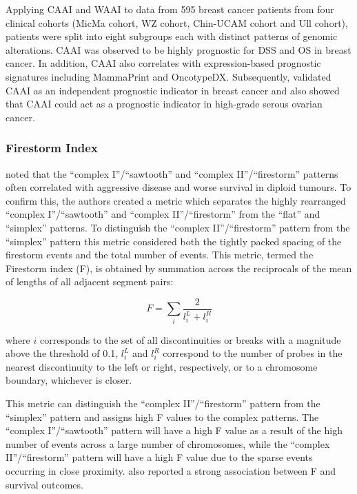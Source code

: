 Applying CAAI and WAAI to data from 595 breast cancer patients from four clinical cohorts (MicMa cohort, WZ cohort, Chin-UCAM cohort and Ull cohort), patients were split into eight subgroups each with distinct patterns of genomic alterations. CAAI was observed to be highly prognostic for DSS and OS in breast cancer. In addition, CAAI also correlates with expression-based prognostic signatures including MammaPrint and OncotypeDX. Subsequently, \cite{pmid25169931} validated CAAI as an independent prognostic indicator in breast cancer and also showed that CAAI could act as a prognostic indicator in high-grade serous ovarian cancer.

\subsubsection{Firestorm Index}
\label{MeasureGIFI}
\cite{pmid17142309} noted that the “complex I”/“sawtooth” and “complex II”/“firestorm” patterns often correlated with aggressive disease and worse survival in diploid tumours. To confirm this, the authors created a metric which separates the highly rearranged “complex I”/“sawtooth” and “complex II”/“firestorm” from the “flat” and “simplex” patterns. To distinguish the “complex II”/“firestorm” pattern from the “simplex” pattern this metric considered both the tightly packed spacing of the firestorm events and the total number of events. This metric, termed the Firestorm index (F), is obtained by summation across the reciprocals of the mean of lengths of all adjacent segment pairs: 

\begin{equation}
F = \sum_i{\frac{2}{l_i^L + l_i^R}}
\end{equation}

where $i$ corresponds to the set of all discontinuities or breaks with a magnitude above the threshold of 0.1, $l_i^L$ and $l_i^R$ correspond to the number of probes in the nearest discontinuity to the left or right, respectively, or to a chromosome boundary, whichever is closer.

This metric can distinguish the “complex II”/“firestorm” pattern from the “simplex” pattern and assigns high F values to the complex patterns. The “complex I”/“sawtooth” pattern will have a high F value as a result of the high number of events across a large number of chromosomes, while the “complex II”/“firestorm” pattern will have a high F value due to the sparse events occurring in close proximity. \cite{pmid17142309} also reported a strong association between F and survival outcomes.

